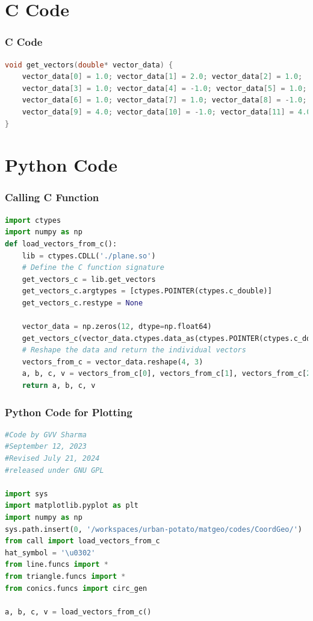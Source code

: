 \documentclass{beamer}
\theoremstyle{remark}
\numberwithin{equation}{section}
\begin{document}
\section{C Code}
\begin{frame}[fragile]
\frametitle{C Code}
\begin{lstlisting}[language=C]
void get_vectors(double* vector_data) {
    vector_data[0] = 1.0; vector_data[1] = 2.0; vector_data[2] = 1.0;
    vector_data[3] = 1.0; vector_data[4] = -1.0; vector_data[5] = 1.0;
    vector_data[6] = 1.0; vector_data[7] = 1.0; vector_data[8] = -1.0;
    vector_data[9] = 4.0; vector_data[10] = -1.0; vector_data[11] = 4.0;
}
    \end{lstlisting}
\end{frame}
\section{Python Code}
\begin{frame}[fragile]
\frametitle{Calling C Function}
\begin{lstlisting}[language=Python]
import ctypes
import numpy as np
def load_vectors_from_c():
    lib = ctypes.CDLL('./plane.so')
    # Define the C function signature
    get_vectors_c = lib.get_vectors
    get_vectors_c.argtypes = [ctypes.POINTER(ctypes.c_double)]
    get_vectors_c.restype = None

    vector_data = np.zeros(12, dtype=np.float64)
    get_vectors_c(vector_data.ctypes.data_as(ctypes.POINTER(ctypes.c_double)))
    # Reshape the data and return the individual vectors
    vectors_from_c = vector_data.reshape(4, 3)
    a, b, c, v = vectors_from_c[0], vectors_from_c[1], vectors_from_c[2], vectors_from_c[3]
    return a, b, c, v
\end{lstlisting}
\end{frame}

\begin{frame}[fragile]
\frametitle{Python Code for Plotting}
\begin{lstlisting}[language=Python]
#Code by GVV Sharma
#September 12, 2023
#Revised July 21, 2024
#released under GNU GPL

import sys
import matplotlib.pyplot as plt
import numpy as np
sys.path.insert(0, '/workspaces/urban-potato/matgeo/codes/CoordGeo/') 
from call import load_vectors_from_c
hat_symbol = '\u0302'
from line.funcs import *
from triangle.funcs import *
from conics.funcs import circ_gen

a, b, c, v = load_vectors_from_c()
 
\end{lstlisting}
\end{frame}
\end{document}
